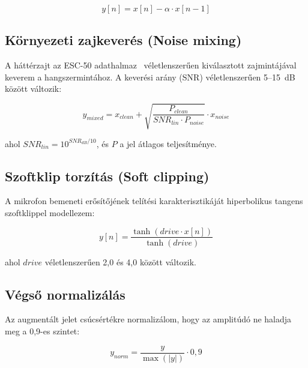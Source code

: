 $$y[n] = x[n] - \alpha \cdot x[n-1]$$

\subsection{Környezeti zajkeverés (Noise mixing)}

A háttérzajt az ESC-50 adathalmaz~\cite{piczak2015esc} véletlenszerűen kiválasztott zajmintájával keverem a hangszermintához. A keverési arány (SNR) véletlenszerűen 5--15~dB között változik:

$$y_{mixed} = x_{clean} + \sqrt{\frac{P_{clean}}{SNR_{lin} \cdot P_{noise}}} \cdot x_{noise}$$

ahol $SNR_{lin} = 10^{SNR_{dB}/10}$, és $P$ a jel átlagos teljesítménye.

\subsection{Szoftklip torzítás (Soft clipping)}

A mikrofon bemeneti erősítőjének telítési karakterisztikáját hiperbolikus tangens szoftklippel modellezem:

$$y[n] = \frac{\tanh(drive \cdot x[n])}{\tanh(drive)}$$

ahol $drive$ véletlenszerűen 2{,}0 és 4{,}0 között változik.

\subsection{Végső normalizálás}

Az augmentált jelet csúcsértékre normalizálom, hogy az amplitúdó ne haladja meg a 0{,}9-es szintet:

$$y_{norm} = \frac{y}{\max(|y|)} \cdot 0{,}9$$

